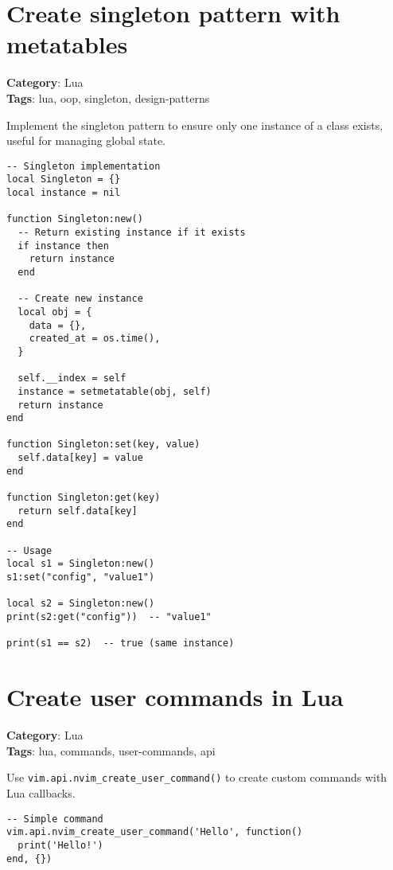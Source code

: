 {{{{{{\section{Create singleton pattern with metatables}

\textbf{Category}: Lua\\ \textbf{Tags}: lua, oop, singleton, design-patterns
\vspace{0.5cm}

Implement the singleton pattern to ensure only one instance of a class exists, useful for managing global state.

\begin{Exa*}{}
\begin{Verbatim}[fontsize=\footnotesize, breaklines, breakanywhere]
-- Singleton implementation
local Singleton = {}
local instance = nil

function Singleton:new()
  -- Return existing instance if it exists
  if instance then
    return instance
  end

  -- Create new instance
  local obj = {
    data = {},
    created_at = os.time(),
  }

  self.__index = self
  instance = setmetatable(obj, self)
  return instance
end

function Singleton:set(key, value)
  self.data[key] = value
end

function Singleton:get(key)
  return self.data[key]
end

-- Usage
local s1 = Singleton:new()
s1:set("config", "value1")

local s2 = Singleton:new()
print(s2:get("config"))  -- "value1"

print(s1 == s2)  -- true (same instance)
\end{Verbatim}
\end{Exa*}

\section{Create user commands in Lua}

\textbf{Category}: Lua\\ \textbf{Tags}: lua, commands, user-commands, api
\vspace{0.5cm}

Use {\footnotesize \Verb§vim.api.nvim_create_user_command()§} to create custom commands with Lua callbacks.

\begin{Exa*}{}
\begin{Verbatim}[fontsize=\footnotesize, breaklines, breakanywhere]
-- Simple command
vim.api.nvim_create_user_command('Hello', function()
  print('Hello!')
end, {})


\end{Verbatim}
\end{Exa*}}}}}}}
